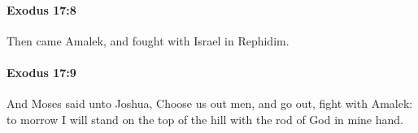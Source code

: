		\paragraph{Exodus 17:8} %
			\label{EXODUS-17-8}

			Then came Amalek, and fought with Israel in Rephidim.


		\paragraph{Exodus 17:9} %
			\label{EXODUS-17-9}

			And Moses said unto Joshua, Choose us out men, and go out, fight with Amalek: to morrow I will stand on the top of the hill with the rod of God in mine hand.


